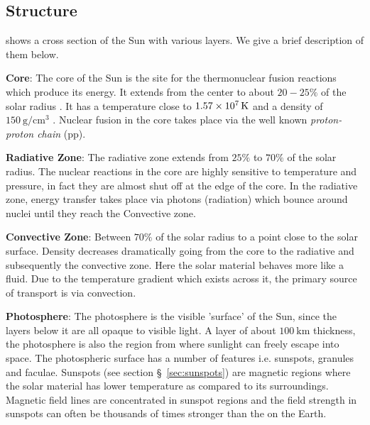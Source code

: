 \subsection{Structure}

 shows a cross section of the Sun with various layers. We give a brief 
description of them below.

\textbf{Core}: The core of the Sun is the site for the thermonuclear fusion reactions which produce 
its energy. It extends from the center to about $20-25\%$ of the solar radius \citep{SolarAct}. It 
has a temperature close to $\SI{1.57d7}{\kelvin}$ and a density of 
$\SI{150}{\gram\per\centi\metre^3}$ \citep{SolarCore}. Nuclear fusion in the core takes place via 
the well known \emph{proton-proton chain} (pp).

\textbf{Radiative Zone}: The radiative zone extends from $25\%$ to $70\%$ of the solar radius. 
The nuclear reactions in the core are highly sensitive to temperature and pressure, in fact they 
are almost shut off at the edge of the core. In the radiative zone, energy transfer takes place via 
photons (radiation) which bounce around nuclei until they reach the Convective zone.

\textbf{Convective Zone}: Between $70\%$ of the solar radius to a point close to the solar surface. 
Density decreases dramatically going from the core to the radiative and subsequently the convective 
zone. Here the solar material behaves more like a fluid. Due to the temperature gradient which 
exists across it, the primary source of transport is via convection.

\textbf{Photosphere}: The photosphere is the visible 'surface' of the Sun, since the layers below 
it are all opaque to visible light. A layer of about $\SI{100}{\kilo\metre}$ thickness, the 
photosphere is also the region from where sunlight can freely escape into space. The photospheric 
surface has a number of features i.e. sunspots, granules and faculae. Sunspots (see section 
\S~\ref{sec:sunspots}) are magnetic regions where the solar material has lower temperature as 
compared to its surroundings. Magnetic field lines are concentrated in sunspot regions and the 
field strength in sunspots can often be thousands of times stronger than the on the Earth.


